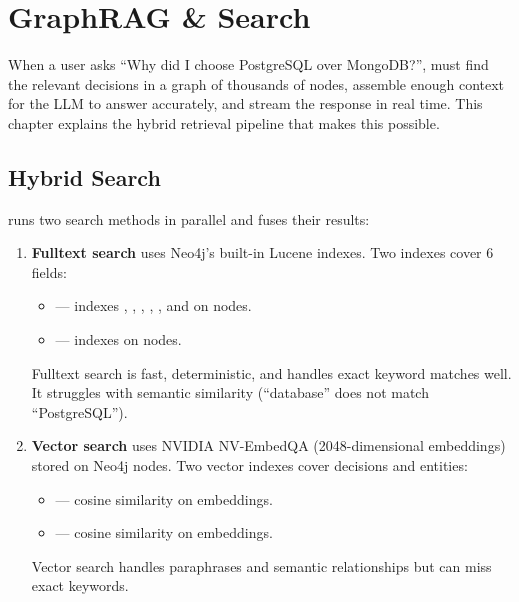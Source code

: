 \chapter{GraphRAG \& Search}
\label{ch:graphrag-search}

When a user asks ``Why did I choose PostgreSQL over MongoDB?'',
\sysname{} must find the relevant decisions in a graph of thousands of
nodes, assemble enough context for the LLM to answer accurately, and
stream the response in real time.  This chapter explains the hybrid
retrieval pipeline that makes this possible.


\section{Hybrid Search}
\label{sec:hybrid-search}

\sysname{} runs two search methods in parallel and fuses their results:

\begin{enumerate}
    \item \textbf{Fulltext search} uses Neo4j's built-in Lucene indexes.
          Two indexes cover 6 fields:
          \begin{itemize}
              \item {} --- indexes
                    , , ,
                    , , and
                     on  nodes.
              \item {} --- indexes  on
                     nodes.
          \end{itemize}
          Fulltext search is fast, deterministic, and handles exact
          keyword matches well.  It struggles with semantic similarity
          (``database'' does not match ``PostgreSQL'').

    \item \textbf{Vector search} uses NVIDIA NV-EmbedQA (2048-dimensional
          embeddings) stored on Neo4j nodes.  Two vector indexes cover
          decisions and entities:
          \begin{itemize}
              \item {} --- cosine similarity on
                     embeddings.
              \item {} --- cosine similarity on
                     embeddings.
          \end{itemize}
          Vector search handles paraphrases and semantic relationships
          but can miss exact keywords.
\end{enumerate}

